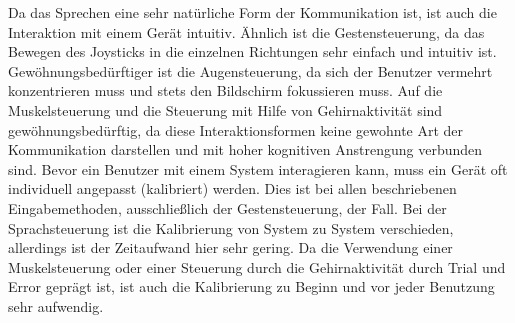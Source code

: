 \newline \newline
Da das Sprechen eine sehr natürliche Form der Kommunikation ist, ist auch die Interaktion mit einem Gerät intuitiv. Ähnlich ist die Gestensteuerung, da das Bewegen des Joysticks in die einzelnen Richtungen sehr einfach und intuitiv ist. Gewöhnungsbedürftiger ist die Augensteuerung, da sich der Benutzer vermehrt konzentrieren muss und stets den Bildschirm fokussieren muss. Auf die Muskelsteuerung und die Steuerung mit Hilfe von Gehirnaktivität sind gewöhnungsbedürftig, da diese Interaktionsformen keine gewohnte Art der Kommunikation darstellen und mit hoher kognitiven Anstrengung verbunden sind.
\newline \newline
Bevor ein Benutzer mit einem System interagieren kann, muss ein Gerät oft individuell angepasst (kalibriert) werden. Dies ist bei allen beschriebenen Eingabemethoden, ausschließlich der Gestensteuerung, der Fall. Bei der Sprachsteuerung ist die Kalibrierung von System zu System verschieden, allerdings ist der Zeitaufwand hier sehr gering. Da die Verwendung einer Muskelsteuerung oder einer Steuerung durch die Gehirnaktivität durch Trial und Error geprägt ist, ist auch die Kalibrierung zu Beginn und vor jeder Benutzung sehr aufwendig.
\newpage
%
